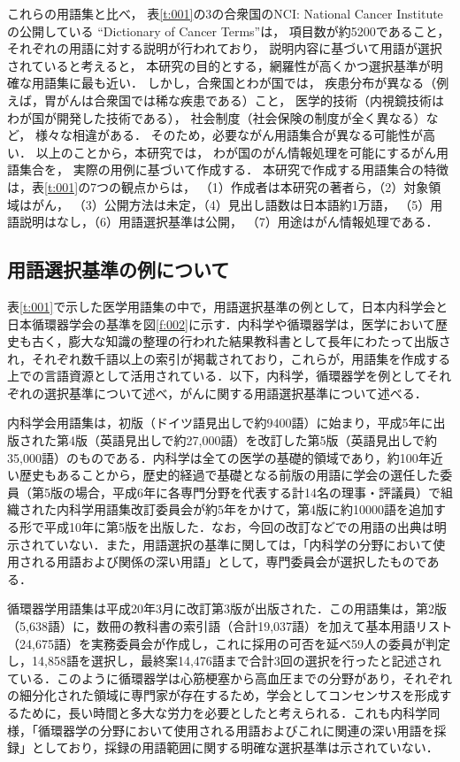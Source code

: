 \documentclass[japanese]{jnlp_1.4}
\begin{document}
これらの用語集と比べ，
表\ref{t:001}の3の合衆国のNCI: National Cancer Instituteの公開している
``Dictionary of Cancer Terms''は，
項目数が約5200であること，
それぞれの用語に対する説明が行われており，
説明内容に基づいて用語が選択されていると考えると，
本研究の目的とする，網羅性が高くかつ選択基準が明確な用語集に最も近い．
しかし，合衆国とわが国では，
疾患分布が異なる（例えば，胃がんは合衆国では稀な疾患である）こと，
医学的技術（内視鏡技術はわが国が開発した技術である），
社会制度（社会保険の制度が全く異なる）など，
様々な相違がある．
そのため，必要ながん用語集合が異なる可能性が高い．
以上のことから，本研究では，
わが国のがん情報処理を可能にするがん用語集合を，
実際の用例に基づいて作成する．
本研究で作成する用語集合の特徴は，表\ref{t:001}の7つの観点からは，
（1）作成者は本研究の著者ら，（2）対象領域はがん，
（3）公開方法は未定，（4）見出し語数は日本語約1万語，
（5）用語説明はなし，（6）用語選択基準は公開，
（7）用途はがん情報処理である．



\subsection{用語選択基準の例について}
\label{s:用語選択基準の例について}

表\ref{t:001}で示した医学用語集の中で，用語選択基準の例として，日本内科学会と日本循環器学会の基準を図\ref{f:002}に示す．内科学や循環器学は，医学において歴史も古く，膨大な知識の整理の行われた結果教科書として長年にわたって出版され，それぞれ数千語以上の索引が掲載されており，これらが，用語集を作成する上での言語資源として活用されている．以下，内科学，循環器学を例としてそれぞれの選択基準について述べ，がんに関する用語選択基準について述べる．

内科学会用語集は，初版（ドイツ語見出しで約9400語）に始まり，平成5年に出版された第4版（英語見出しで約27,000語）を改訂した第5版（英語見出しで約35,000語）のものである．内科学は全ての医学の基礎的領域であり，約100年近い歴史もあることから，歴史的経過で基礎となる前版の用語に学会の選任した委員（第5版の場合，平成6年に各専門分野を代表する計14名の理事・評議員）で組織された内科学用語集改訂委員会が約5年をかけて，第4版に約10000語を追加する形で平成10年に第5版を出版した．なお，今回の改訂などでの用語の出典は明示されていない．また，用語選択の基準に関しては，「内科学の分野において使用される用語および関係の深い用語」として，専門委員会が選択したものである．

循環器学用語集は平成20年3月に改訂第3版が出版された．この用語集は，第2版（5,638語）に，数冊の教科書の索引語（合計19,037語）を加えて基本用語リスト（24,675語）を実務委員会が作成し，これに採用の可否を延べ59人の委員が判定し，14,858語を選択し，最終案14,476語まで合計3回の選択を行ったと記述されている．このように循環器学は心筋梗塞から高血圧までの分野があり，それぞれの細分化された領域に専門家が存在するため，学会としてコンセンサスを形成するために，長い時間と多大な労力を必要としたと考えられる．これも内科学同様，「循環器学の分野において使用される用語およびこれに関連の深い用語を採録」としており，採録の用語範囲に関する明確な選択基準は示されていない．
\end{document}
